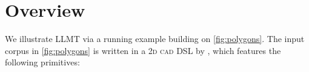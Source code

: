 \documentclass[acmsmall,screen,nonacm,review=false,timestamp=false]{acmart}
\newcommand{\TODO}[1]{{\color{orange!80!black}[\textsl{#1}]}}
\newcommand{\TODO}[1]{}
\newcommand{\tname}[1]{\textsc{#1}\xspace}
\newcommand{\T}[1]{\mbox{\lstinline^#1^}}
\newcommand{\cogsci}{\tname{2d cad}}
\begin{document}

 \section{Overview}
\label{sec:overview}

\newcommand{\xargs}[4]{\ensuremath{[#1, #2, #3, #4]}}
\newcommand{\xform}[2]{\ensuremath{\T{xform}(#1,\ #2)}}
\newcommand{\rep}[3]{\ensuremath{\T{repeat}(#1,\ #2,\ #3)}}
\newcommand{\comb}[2]{\ensuremath{\T{combine}(#1,\ #2)}}

\newcommand{\scale}[2]{\ensuremath{\T{scale}(#1,\ #2)}}
\newcommand{\repRot}[3]{\ensuremath{\T{repRot}(#1,\ #2,\ #3)}}
\newcommand{\rotate}[2]{\ensuremath{\T{rotate}(#1,\ #2)}}
\newcommand{\translate}[3]{\ensuremath{\T{translate}(#1,\ #2,\ #3)}}

\newcommand{\pSide}[1]{\ensuremath{\T{side}(#1)}}
\newcommand{\ngon}[1]{\ensuremath{\T{ngon}(#1)}}
\newcommand{\scaledHex}[1]{\ensuremath{\T{scaledHexagon}(#1)}}







We illustrate LLMT via a running example building on \autoref{fig:polygons}.
The input corpus in \autoref{fig:polygons} is written in a \cogsci DSL by \citet{cogsci-dataset},
which features the following primitives:
\end{document}
